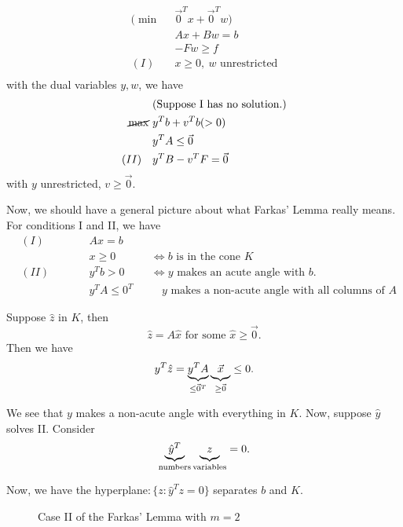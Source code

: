\begin{eg}
	\begin{align*}
		(\min~   & \vec{0}^{T} x + \vec{0}^{T} w)   \\
		         & Ax + Bw = b                      \\
		         & -Fw \geq f                       \\
		(I)\quad & x\geq  0,\ w\text{ unrestricted} \\
	\end{align*}
	with the dual variables \(y, w\), we have
	\begin{align*}
		               & (\text{Suppose I has no solution.}) \\
		\cancel{\max}~ & y^{T} b + v^{T} b (>0)              \\
		               & y^{T} A \leq \vec{0}                \\
		(II)\quad      & y^{T} B - v^{T} F = \vec{0}
	\end{align*}
	with \(y\) unrestricted, \(v\geq  \vec{0}\).
\end{eg}

\hr

Now, we should have a general picture about what Farkas' Lemma really means. For conditions I and II, we have
\[
	\begin{alignedat}{3}
		& (I) \qquad&& Ax = b       \\
		&      && x\geq 0    && \iff b \text{ is in the cone }K \\
		& (II) \qquad&& y^{T}b> 0 &&\iff y \text{ makes an acute angle with }b.\\
		&      && y^{T}A\leq 0^{T}&&\quad y\text{ makes a non-acute angle with all columns of }A
	\end{alignedat}
\]

Suppose \(\hat{z}\) in \(K\), then
\[
	\hat{z} = A \hat{x} \text{ for some }\hat{x} \geq  \vec{0}.
\]
Then we have
\[
	y^{T} \hat{z} = \underbrace{y^{T} A}_{\leq\vec{0}^{T}} \underbrace{\vphantom{y}\vec{x}}_{\geq  \vec{0}}  \leq 0.
\]

We see that \(y\) makes a non-acute angle with everything in \(K\). Now, suppose \(\hat{y}\) solves II. Consider
\[
	\underbrace{\hat{y}^{T}}_{\text{numbers}} \underbrace{\vphantom{y}z}_{\text{variables}} = 0.
\]

Now, we have the hyperplane\(\colon\)\(\{z\colon \hat{y} ^{T} z = 0\}\) separates \(b\) and \(K\).

\begin{figure}[H]
	\centering
	\caption{Case II of the Farkas' Lemma with \(m = 2\)}
	\label{fig:Farkas-lemma-extended}
\end{figure}

